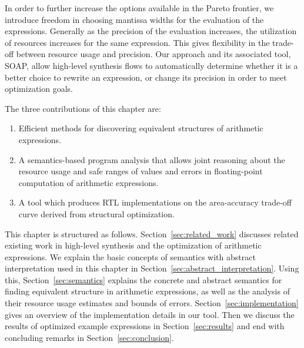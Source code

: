 In order to further increase the options available in the Pareto frontier,
we introduce freedom in choosing mantissa widths for the evaluation of the
expressions. Generally as the precision of the evaluation increases, the
utilization of resources increases for the same expression. This gives
flexibility in the trade-off between resource usage and precision. Our
approach and its associated tool, SOAP, allow high-level synthesis flows to
automatically determine whether it is a better choice to rewrite an expression,
or change its precision in order to meet optimization goals.

The three contributions of this chapter are:
\begin{enumerate}
    \item Efficient methods for discovering equivalent structures of
    arithmetic expressions.
    \item A semantics-based program analysis that allows joint reasoning about
    the resource usage and safe ranges of values and errors in floating-point
    computation of arithmetic expressions.
    \item A tool which produces RTL implementations on the area-accuracy
    trade-off curve derived from structural optimization.
\end{enumerate}

This chapter is structured as follows. Section~\ref{sec:related_work}
discusses related existing work in high-level synthesis and the
optimization of arithmetic expressions. We explain the basic
concepts of semantics with abstract interpretation used in this
chapter in Section~\ref{sec:abstract_interpretation}. Using this,
Section~\ref{sec:semantics} explains the concrete and abstract semantics
for finding equivalent structure in arithmetic expressions, as well as
the analysis of their resource usage estimates and bounds of errors.
Section~\ref{sec:implementation} gives an overview of the implementation
details in our tool. Then we discuss the results of optimized example
expressions in Section~\ref{sec:results} and end with concluding remarks in
Section~\ref{sec:conclusion}.
